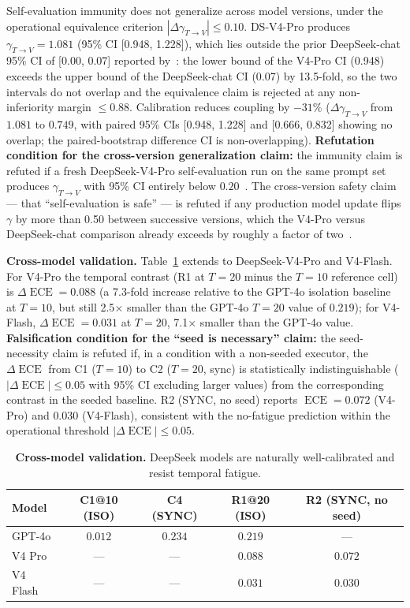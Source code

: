 \documentclass[11pt]{article}
\DeclareMathOperator{\ECE}{ECE}
\begin{document}
Self-evaluation immunity does not generalize across model versions, under the operational equivalence criterion $|\Delta\gamma_{T\to V}| \leq 0.10$. DS-V4-Pro produces $\gamma_{T \to V} = 1.081$ (95\% CI [0.948, 1.228]), which lies outside the prior DeepSeek-chat 95\% CI of [0.00, 0.07] reported by~\citet{liu2026epc}: the lower bound of the V4-Pro CI (0.948) exceeds the upper bound of the DeepSeek-chat CI (0.07) by 13.5-fold, so the two intervals do not overlap and the equivalence claim is rejected at any non-inferiority margin $\leq 0.88$. Calibration reduces coupling by $-31\%$ ($\Delta\gamma_{T\to V}$ from $1.081$ to $0.749$, with paired 95\% CIs [0.948, 1.228] and [0.666, 0.832] showing no overlap; the paired-bootstrap difference CI is non-overlapping). \textbf{Refutation condition for the cross-version generalization claim:} the immunity claim is refuted if a fresh DeepSeek-V4-Pro self-evaluation run on the same prompt set produces $\gamma_{T\to V}$ with 95\% CI entirely below $0.20$~\citep{liu2026epc,tian2023just}. The cross-version safety claim — that ``self-evaluation is safe'' — is refuted if any production model update flips $\gamma$ by more than 0.50 between successive versions, which the V4-Pro versus DeepSeek-chat comparison already exceeds by roughly a factor of two~\citep{sclar2024quantifying}.

\textbf{Cross-model validation.} Table~\ref{tab:cross} extends to DeepSeek-V4-Pro and V4-Flash. For V4-Pro the temporal contrast (R1 at $T{=}20$ minus the $T{=}10$ reference cell) is $\Delta\ECE = 0.088$ (a 7.3-fold increase relative to the GPT-4o isolation baseline at $T{=}10$, but still 2.5$\times$ smaller than the GPT-4o $T{=}20$ value of $0.219$); for V4-Flash, $\Delta\ECE = 0.031$ at $T{=}20$, 7.1$\times$ smaller than the GPT-4o value. \textbf{Falsification condition for the ``seed is necessary'' claim:} the seed-necessity claim is refuted if, in a condition with a non-seeded executor, the $\Delta\ECE$ from C1 ($T{=}10$) to C2 ($T{=}20$, sync) is statistically indistinguishable ($|\Delta\ECE| \leq 0.05$ with 95\% CI excluding larger values) from the corresponding contrast in the seeded baseline. R2 (SYNC, no seed) reports $\ECE = 0.072$ (V4-Pro) and $0.030$ (V4-Flash), consistent with the no-fatigue prediction within the operational threshold $|\Delta\ECE| \leq 0.05$.

\begin{table}[H]
\centering
\caption{\textbf{Cross-model validation.} DeepSeek models are naturally well-calibrated and resist temporal fatigue.}
\label{tab:cross}
\begin{tabular}{@{}lcccc@{}}
\toprule
Model & C1@10 (ISO) & C4 (SYNC) & R1@20 (ISO) & R2 (SYNC, no seed) \\
\midrule
GPT-4o & $0.012$ & $0.234$ & $0.219$ & --- \\
V4 Pro & --- & --- & $0.088$ & $0.072$ \\
V4 Flash & --- & --- & $0.031$ & $0.030$ \\
\bottomrule
\end{tabular}
\end{table}
\end{document}
